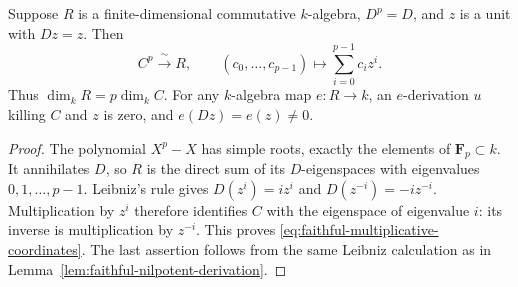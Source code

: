 \begin{srlemma}
\label{lem:faithful-multiplicative-derivation}
Suppose \(R\) is a finite-dimensional commutative \(k\)-algebra,
\(D^p=D\), and \(z\) is a unit with \(Dz=z\).  Then
\[
 C^p\xrightarrow{\ \sim\ }R,\qquad
 (c_0,\ldots,c_{p-1})\longmapsto\sum_{i=0}^{p-1}c_i z^i .
 \tag{HC2}\label{eq:faithful-multiplicative-coordinates}
\]
Thus \(\dim_kR=p\dim_k C\).  For any \(k\)-algebra map \(e:R\to k\),
an \(e\)-derivation \(u\) killing \(C\) and \(z\) is zero, and
\(e(Dz)=e(z)\ne0\).
\end{srlemma}
\begin{proof}
The polynomial \(X^p-X\) has simple roots, exactly the elements of
\(\mathbf F_p\subset k\).  It annihilates \(D\), so \(R\) is the
direct sum of its \(D\)-eigenspaces with eigenvalues
\(0,1,\ldots,p-1\).  Leibniz's rule gives
\(D(z^i)=i z^i\) and \(D(z^{-i})=-i z^{-i}\).
Multiplication by \(z^i\) therefore identifies \(C\) with the
eigenspace of eigenvalue \(i\): its inverse is multiplication by
\(z^{-i}\).  This proves \eqref{eq:faithful-multiplicative-coordinates}.
The last assertion follows from the same Leibniz calculation as
in Lemma~\ref{lem:faithful-nilpotent-derivation}.
\end{proof}

